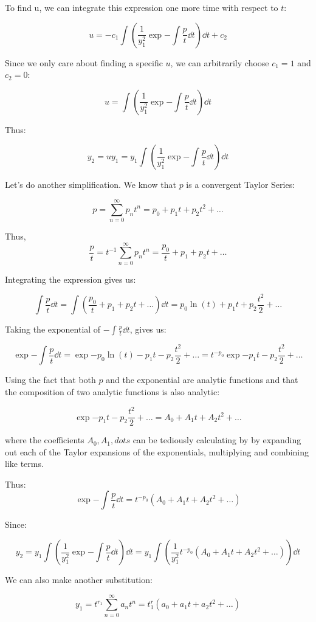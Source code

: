 \documentclass{report}
\begin{document}
{To find u, we can integrate this expression one more time with respect to $t$:

$$u = -c_1\int\left(\frac{1}{y_1^2}\exp{-\int \frac{p}{t}} \dd t\right) \dd t + c_2 $$


Since we only care about finding a specific $u$, we can arbitrarily choose $c_1=1$ and $c_2 = 0$:

$$u = \int\left(\frac{1}{y_1^2}\exp{-\int \frac{p}{t} \dd t}\right) \dd t $$

Thus:

$$y_2 = uy_1 = y_1\int\left(\frac{1}{y_1^2}\exp{-\int \frac{p}{t} \dd t}\right) \dd t$$

Let's do another simplification. We know that $p$ is a convergent Taylor Series:

$$p = \sum_{n=0}^\infty p_nt^n = p_0 + p_1t + p_2t^2 + \dots$$

Thus,
$$\frac{p}{t} = t^{-1}\sum_{n=0}^\infty p_nt^n = \frac{p_0}{t} + p_1 + p_2t + \dots$$

Integrating the expression gives us:

$$\int \frac{p}{t} \dd t
= \int \left( \frac{p_0}{t} + p_1 + p_2t + \dots\right) \dd t = p_0\ln(t) + p_1t + p_2\frac{t^2}{2} + \dots$$

Taking the exponential of $-\int \frac{p}{t} \dd t$, gives us:

$$\exp{-\int \frac{p}{t} \dd t}
= \exp{-p_0\ln(t) - p_1t -  p_2\frac{t^2}{2} + \dots}
= t^{-p_0}\exp{- p_1t -  p_2\frac{t^2}{2} + \dots}
$$

Using the fact that both $p$ and the exponential are analytic functions and that the composition of two analytic functions is also analytic:

$$\exp{- p_1t -  p_2\frac{t^2}{2} + \dots} = A_0 + A_1t + A_2t^2 + \dots$$

where the coefficients $A_0, A_1, dots$ can be tediously calculating by by expanding out each of the Taylor expansions of the exponentials, multiplying and combining like terms.


Thus:
$$\exp{-\int \frac{p}{t} \dd t} = t^{-p_0}(A_0 + A_1t + A_2t^2 + \dots)$$


Since:

$$y_2 = y_1\int\left(\frac{1}{y_1^2}\exp{-\int \frac{p}{t} \dd t}\right) \dd t = y_1\int\left( \frac{1}{y_1^2}  t^{-p_0}(A_0 + A_1t + A_2t^2 + \dots) \right) \dd t$$

We can also make another substitution:

$$y_1 = t^{r_1}\sum_{n=0}^\infty a_nt^n = t^r_1(a_0 + a_1t + a_2t^2 + \dots)
$$

}
\end{document}
